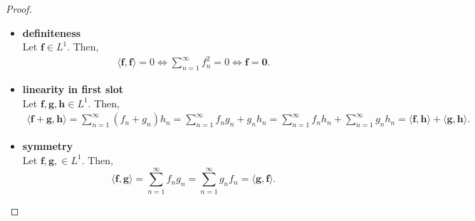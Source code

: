 \begin{proof}
\begin{itemize}
        \item \textbf{definiteness} \\ Let $\mathbf{f} \in L^1$.
            Then,
            \begin{align*}
                \langle \mathbf{f}, \mathbf{f} \rangle = 0
                \iff
                \sum\limits_{n=1}^{\infty} f_n^2 = 0
                \iff
                \mathbf{f} = \mathbf{0}.
            \end{align*}

        \item \textbf{linearity in first slot} \\
            Let $\mathbf{f}, \mathbf{g}, \mathbf{h} \in L^1$.
            Then,
            \begin{align*}
                \langle \mathbf{f} + \mathbf{g}, \mathbf{h} \rangle
                = \sum\limits_{n=1}^{\infty} (f_n + g_n)h_n
                = \sum\limits_{n=1}^{\infty} f_ng_n + g_nh_n
                = \sum\limits_{n=1}^{\infty} f_nh_n +\sum\limits_{n=1}^{\infty} g_nh_n
                = \langle \mathbf{f}, \mathbf{h} \rangle + \langle \mathbf{g}, \mathbf{h} \rangle.
            \end{align*}

        \item \textbf{symmetry} \\
            Let $\mathbf{f}, \mathbf{g}, \in L^1$.
            Then,
            \begin{equation*}
                \langle \mathbf{f}, \mathbf{g} \rangle
                = \sum\limits_{n=1}^{\infty} f_ng_n
                = \sum\limits_{n=1}^{\infty} g_nf_n
                = \langle \mathbf{g}, \mathbf{f} \rangle.
            \end{equation*}
    \end{itemize}
\end{proof}

